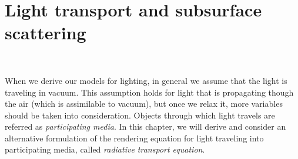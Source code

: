 \section{Light transport and subsurface scattering}
\FloatBarrier
\begin{figure}
\centering
{}
 \\
\label{fig:transport}
\end{figure}

When we derive our models for lighting, in general we assume that the light is traveling in vacuum. This assumption holds for light that is propagating though the air (which is assimilable to vacuum), but once we relax it, more variables should be taken into consideration. Objects through which light travels are referred as \emph{participating media}. In this chapter, we will derive and consider an alternative formulation of the rendering equation for light traveling into participating media, called \emph{radiative transport equation}.


